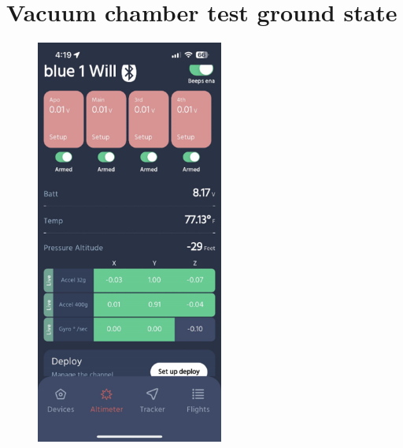 \chapter{Vacuum chamber test ground state}\label{apdx:vacuum_ground-raven}
\vfill{}
\begin{figure}[h]
  \begin{center}
    \includegraphics[width=0.55\textwidth]{./img/vacuum_ground-raven.png}
  \end{center}
\end{figure}
\vfill{}

\clearpage


